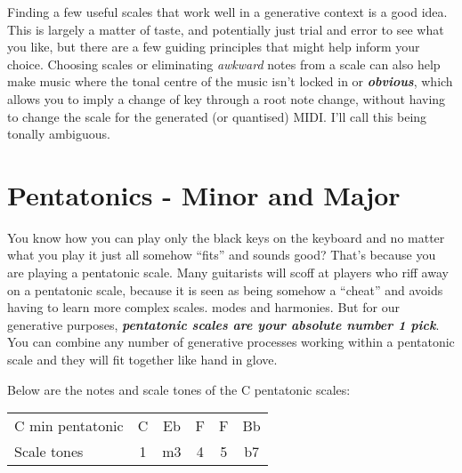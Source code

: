 \documentclass[
  12pt,
  letterpaper,
  oneside,
  open=any]{scrbook}
\begin{document}
\begin{tcolorbox}[enhanced jigsaw, toprule=.15mm, leftrule=.75mm, coltitle=black, bottomtitle=1mm, colbacktitle=quarto-callout-tip-color!10!white, bottomrule=.15mm, opacityback=0, colback=white, arc=.35mm, colframe=quarto-callout-tip-color-frame, opacitybacktitle=0.6, toptitle=1mm, titlerule=0mm, rightrule=.15mm, title=\textcolor{quarto-callout-tip-color}{\faLightbulb}\hspace{0.5em}{Key idea}, left=2mm, breakable]

Finding a few useful scales that work well in a generative context is a
good idea. This is largely a matter of taste, and potentially just trial
and error to see what you like, but there are a few guiding principles
that might help inform your choice. Choosing scales or eliminating
\emph{awkward} notes from a scale can also help make music where the
tonal centre of the music isn't locked in or \textbf{\emph{obvious}},
which allows you to imply a change of key through a root note change,
without having to change the scale for the generated (or quantised)
MIDI. I'll call this being tonally ambiguous.

\end{tcolorbox}

\section{Pentatonics - Minor and
Major}\label{pentatonics---minor-and-major}

You know how you can play only the black keys on the keyboard and no
matter what you play it just all somehow ``fits'' and sounds good?
That's because you are playing a pentatonic scale. Many guitarists will
scoff at players who riff away on a pentatonic scale, because it is seen
as being somehow a ``cheat'' and avoids having to learn more complex
scales. modes and harmonies. But for our generative purposes,
\textbf{\emph{pentatonic scales are your absolute number 1 pick}}. You
can combine any number of generative processes working within a
pentatonic scale and they will fit together like hand in glove.

Below are the notes and scale tones of the C pentatonic scales:

\begin{longtable}[]{@{}lccccc@{}}
\toprule\noalign{}
\endhead
\bottomrule\noalign{}
\endlastfoot
C min pentatonic & C & Eb & F & F & Bb \\
Scale tones & 1 & m3 & 4 & 5 & b7 \\
\end{longtable}
\end{document}
